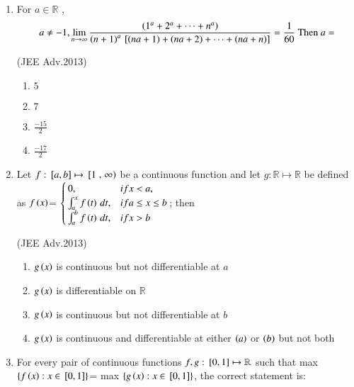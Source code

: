 \documentclass[journal]{IEEEtran}
\numberwithin{equation}{enumi}
\numberwithin{figure}{enumi}
\begin{document}
\begin{enumerate}
    \item 
	    For $a\in \mathbb{R}$ , 
    \begin{align*}
	    a\neq -1, \lim_{n\to\infty}\frac{\left(1^a+2^a+\cdots+n^a\right)}{\left(n+1\right)^a{}\left[\left(na+1\right)+\left(na+2\right)+\cdots+\left(na+n\right)\right]}
	    =\frac{1}{60} \text{ Then } a=
    \end{align*}

    \hfill(JEE Adv.2013)
    
    \begin{multicols}{4}
    \begin{enumerate}
        \item $5$
        \item $7$ 
        \item $\frac{-15}{2}$ 
        \item $\frac{-17}{2}$ 
    \end{enumerate}
    \end{multicols}


    \item 
    Let $f: {}\left[a,b\right]\mapsto {}\left[1\right.,\left.\infty\right)$ be a continuous function and let $g: \mathbb{R}\mapsto \mathbb{R}$ be defined as 
    $f\left(x\right)$= 
    $\begin{cases}
       0, & if x<a, \\
       \int_{a}^{x}{f\left(t\right) \, dt}, & if a\leq x\leq b \\
       \int_{a}^{b}{f\left(t\right) \, dt}, & if x>b
    \end{cases}$; then 

    \hfill(JEE Adv.2013)
    
    \begin{enumerate}
        \item $g\left(x\right)$ is continuous but not differentiable at $a$
        \item $g\left(x\right)$ is differentiable on $\mathbb{R}$
        \item $g\left(x\right)$ is continuous but not differentiable at $b$
        \item $g\left(x\right)$ is continuous and differentiable at either $\left(a\right)$ or $\left(b\right)$ but not both 
    \end{enumerate}


    \item 
	  For every pair of continuous functions $f, g: {}\left[0, 1\right]\mapsto \mathbb{R}$ such that max $\left\{f\left(x\right): x\in {}\left[0, 1\right]\right\}$= max $\left\{g\left(x\right): x\in {}\left[0, 1\right]\right\}$, the correct statement is: 
    

\end{enumerate}
\end{document}
